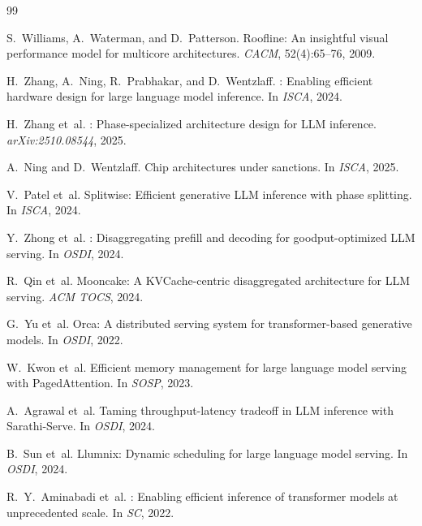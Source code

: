 \documentclass[sigconf,10pt]{acmart}
\begin{document}
\begin{thebibliography}{99}


S.~Williams, A.~Waterman, and D.~Patterson.
\newblock Roofline: An insightful visual performance model for multicore
  architectures.
\newblock \emph{CACM}, 52(4):65--76, 2009.

H.~Zhang, A.~Ning, R.~Prabhakar, and D.~Wentzlaff.
: Enabling efficient hardware design for large language
  model inference.
\newblock In \emph{ISCA}, 2024.

H.~Zhang et~al.
: Phase-specialized architecture design for {LLM} inference.
\newblock \emph{arXiv:2510.08544}, 2025.

A.~Ning and D.~Wentzlaff.
\newblock Chip architectures under sanctions.
\newblock In \emph{ISCA}, 2025.


V.~Patel et~al.
\newblock Splitwise: Efficient generative {LLM} inference with phase splitting.
\newblock In \emph{ISCA}, 2024.

Y.~Zhong et~al.
: Disaggregating prefill and decoding for goodput-optimized
  {LLM} serving.
\newblock In \emph{OSDI}, 2024.

R.~Qin et~al.
\newblock Mooncake: A {KVCache}-centric disaggregated architecture for {LLM}
  serving.
\newblock \emph{ACM TOCS}, 2024.


G.~Yu et~al.
\newblock Orca: A distributed serving system for transformer-based generative
  models.
\newblock In \emph{OSDI}, 2022.

W.~Kwon et~al.
\newblock Efficient memory management for large language model serving with
  {PagedAttention}.
\newblock In \emph{SOSP}, 2023.

A.~Agrawal et~al.
\newblock Taming throughput-latency tradeoff in {LLM} inference with
  {Sarathi-Serve}.
\newblock In \emph{OSDI}, 2024.

B.~Sun et~al.
\newblock Llumnix: Dynamic scheduling for large language model serving.
\newblock In \emph{OSDI}, 2024.

R.~Y.~Aminabadi et~al.
: Enabling efficient inference of transformer
  models at unprecedented scale.
\newblock In \emph{SC}, 2022.


\end{thebibliography}
\end{document}
